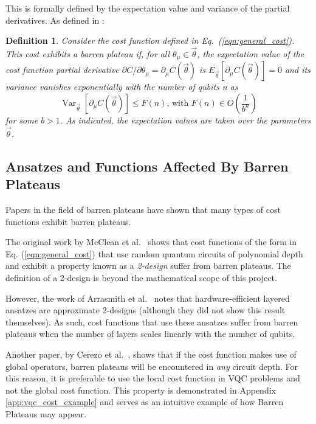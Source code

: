 \documentclass[a4paper,12pt]{article}
\newcommand{\thetas}{\vec{\theta}}
\newcommand{\del}{\partial}
\DeclareMathOperator{\Var}{Var}
\newtheorem{definition}{Definition}
\begin{document}
This is formally defined by the expectation value and variance of the partial derivatives.
As defined in \cite{arrasmith_effect_2021}:

\begin{definition} \label{def:bp}
    Consider the cost function defined in Eq.~(\ref{eqn:general_cost}). This cost exhibits a barren plateau if, for all $\theta_\mu \in \thetas$, the expectation value of the cost function partial derivative
    $\del C / \del\theta_\mu = \del_\mu C(\thetas)$
    is
    $E_{\thetas}[\del_\mu C(\thetas)] = 0$
    and its variance vanishes exponentially with the number of qubits n as 
    \begin{equation} \label{eqn:vanishing}
        \Var_{\thetas}[\del_\mu C(\thetas)] \leq F(n) \textrm{,   with   }F(n) \in O\left(\frac{1}{b^n}\right)
    \end{equation}
    for some $b > 1$. As indicated, the expectation values are taken over the parameters $\thetas$.
\end{definition}

\subsection{Ansatzes and Functions Affected By Barren Plateaus}
Papers in the field of barren plateaus have shown that many types of cost functions exhibit barren plateaus.

The original work by McClean et al.~\cite{mcclean_barren_2018} shows that cost functions of the form in Eq. (\ref{eqn:general_cost}) that use random quantum circuits of polynomial depth and exhibit a property known as a \emph{2-design} suffer from barren plateaus.
The definition of a 2-design is beyond the mathematical scope of this project.

However, the work of Arrasmith et al.~\cite{arrasmith_effect_2021} notes that hardware-efficient layered ansatzes are approximate 2-designs (although they did not show this result themselves).
As such, cost functions that use these ansatzes suffer from barren plateaus when the number of layers scales linearly with the number of qubits.

Another paper, by Cerezo et al.~\cite{cerezo_cost_2021}, shows that if the cost function makes use of global operators, barren plateaus will be encountered in \emph{any} circuit depth.
For this reason, it is preferable to use the local cost function in VQC problems and not the global cost function.
This property is demonstrated in Appendix \ref{app:vqc_cost_example} and serves as an intuitive example of how Barren Plateaus may appear.
\end{document}
